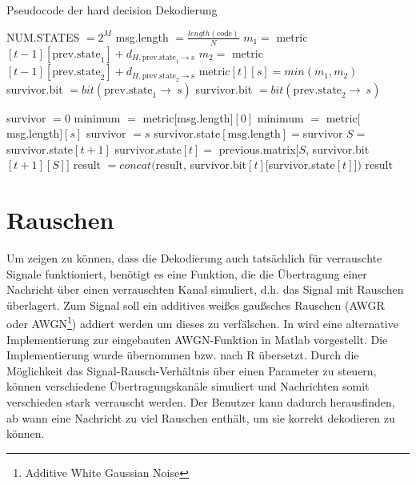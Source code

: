 \begin{algorithm}[H]
\renewcommand{\algorithmicforall}{\textbf{for each}}
\caption{Pseudocode der hard decision Dekodierung}
\label{algorithmus:dekodierung}
\begin{algorithmic}[1]
\STATE NUM.STATES $=2^{M}$
\STATE msg.length $=\frac{\mathit{length}(\mathrm{code})}{N}$
   	\STATE $m_{1}=$ metric$[t-1][\mathrm{prev.state}_1] + d_{H, \mathrm{prev.state}_1\rightarrow \mathrm{s}}$
   	\STATE $m_{2}=$ metric$[t-1][\mathrm{prev.state}_2] + d_{H, \mathrm{prev.state}_2\rightarrow \mathrm{s}}$
      \STATE metric$[t][s]=\mathit{min}(m_{1},m_{2})$
      	\STATE survivor.bit $=\mathit{bit}(\mathrm{prev.state}_1\rightarrow\ s)$
      \ELSE
      	\STATE survivor.bit $=\mathit{bit}(\mathrm{prev.state}_2\rightarrow\ s)$
      \ENDIF
	\ENDFOR
\ENDFOR

	\STATE survivor $=0$
\ELSE
	\STATE minimum $=$ metric$[$msg.length$][0]$
			\STATE minimum $=$ metric$[$msg.length$][s]$
			\STATE survivor $=s$
		\ENDIF
	\ENDFOR
\ENDIF
\STATE survivor.state$[\mathrm{msg.length}]=$survivor
	\STATE $S=$ survivor.state$[t+1]$
	\STATE survivor.state$[t]=$ previous.matrix$[S$, survivor.bit$[t+1][S]]$
\ENDFOR
{}
	\STATE result $=\mathit{concat}($result, survivor.bit$[t][$survivor.state$[t]])$
\ENDFOR
\RETURN result
\end{algorithmic}
\end{algorithm}

\section{Rauschen}
\label{kapitel:implementierung_noise}
Um zeigen zu können, dass die Dekodierung auch tatsächlich für verrauschte Signale funktioniert, benötigt es eine Funktion, die die Übertragung einer Nachricht über einen verrauschten Kanal simuliert, d.h. das Signal mit Rauschen überlagert. Zum Signal soll ein additives weißes gaußsches Rauschen (AWGR oder AWGN\footnote{Additive White Gaussian Noise}) addiert werden um dieses zu verfälschen. In \cite{AWGN} wird eine alternative Implementierung zur eingebauten AWGN-Funktion in Matlab vorgestellt. Die Implementierung wurde übernommen bzw. nach R übersetzt. Durch die Möglichkeit das Signal-Rausch-Verhältnis über einen Parameter zu steuern, können verschiedene Übertragungskanäle simuliert und Nachrichten somit verschieden stark verrauscht werden. Der Benutzer kann dadurch herausfinden, ab wann eine Nachricht zu viel Rauschen enthält, um sie korrekt dekodieren zu können.

